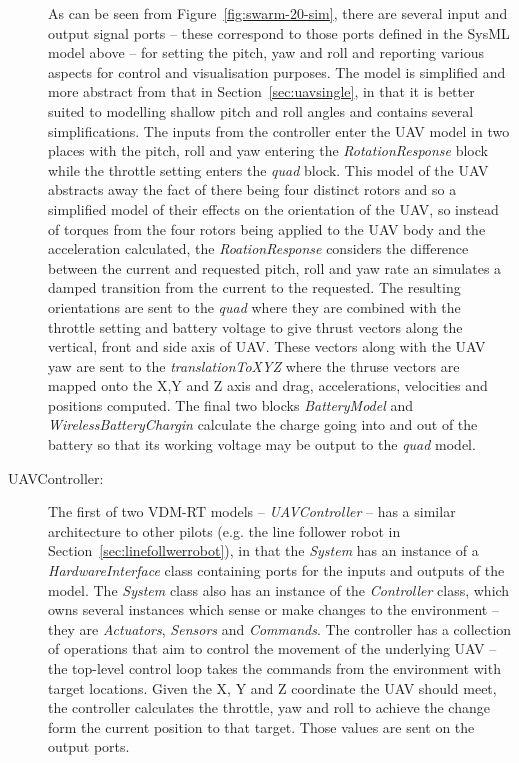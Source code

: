 \begin{description}
As can be seen from Figure~\ref{fig:swarm-20-sim}, there are several input and output signal ports -- these correspond to those ports defined in the SysML model above -- for setting the pitch, yaw and roll and reporting various aspects for control and visualisation purposes. The model is simplified and more abstract from that in Section~\ref{sec:uavsingle}, in that it is better suited to modelling shallow pitch and roll angles and contains several simplifications. The inputs from the controller enter the UAV model in two places with the pitch, roll and yaw entering the \emph{RotationResponse} block while the throttle setting enters the \emph{quad} block.  This model of the UAV abstracts away the fact of there being four distinct rotors and so a simplified model of their effects on the orientation of the UAV, so instead of torques from the four rotors being applied to the UAV body and the acceleration calculated, the \emph{RoationResponse} considers the difference between the current and requested pitch, roll and yaw rate an simulates a damped transition from the current to the requested.   The resulting orientations are sent to the \emph{quad} where they are combined with the throttle setting and battery voltage to give thrust vectors along the vertical, front and side axis of UAV.  These vectors along with the UAV yaw are sent to the \emph{translationToXYZ} where the thruse vectors are mapped onto the X,Y and Z axis and drag, accelerations, velocities and positions computed.  The final two blocks \emph{BatteryModel} and \emph{WirelessBatteryChargin} calculate the charge going into and out of the battery so that its working voltage may be output to the \emph{quad} model.

\item[UAVController:] The first of two VDM-RT models -- \emph{UAVController} -- has a similar architecture to other pilots (e.g. the line follower robot in Section~\ref{sec:linefollwerrobot}), in that the \emph{System} has an instance of a \emph{HardwareInterface} class containing ports for the inputs and outputs of the model. The \emph{System} class also has an instance of the  \emph{Controller} class, which owns several instances which sense or make changes to the environment -- they are \emph{Actuators}, \emph{Sensors} and \emph{Commands}. The controller has a collection of operations that aim to control the movement of the underlying UAV -- the top-level control loop takes the commands from the environment with target locations. Given the X, Y  and Z coordinate the UAV should meet, the controller calculates the throttle, yaw and roll to achieve the change form the current position to that target. Those values are sent on the output ports.


\end{description}
